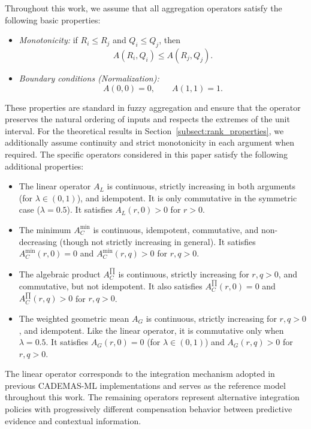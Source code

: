 \documentclass[mathematics,article,submit,moreauthors]{Definitions/mdpi}
\begin{document}
{\color{red}
Throughout this work, we assume that all aggregation operators satisfy the following basic properties:

\begin{itemize}
\item \textit{Monotonicity:} if $R_i\le R_j$ and $Q_i\le Q_j$, then
\[
A(R_i,Q_i)\le A(R_j,Q_j).
\]
\item \textit{Boundary conditions (Normalization):}
\[
A(0,0)=0,\qquad A(1,1)=1.
\]
\end{itemize}

These properties are standard in fuzzy aggregation and ensure that the operator preserves the natural ordering of inputs and respects the extremes of the unit interval. For the theoretical results in Section~\ref{subsect:rank_properties}, we additionally assume continuity and strict monotonicity in each argument when required. The specific operators considered in this paper satisfy the following additional properties:

\begin{itemize}
\item The linear operator $A_L$ is continuous, strictly increasing in both arguments (for $\lambda\in(0,1)$), and idempotent. It is only commutative in the symmetric case ($\lambda=0.5$). It satisfies $A_L(r,0)>0$ for $r>0$.

\item The minimum $A_C^{\min}$ is continuous, idempotent, commutative, and non-decreasing (though not strictly increasing in general). It satisfies $A_C^{\min}(r,0)=0$ and $A_C^{\min}(r,q)>0$ for $r,q>0$.

\item The algebraic product $A_C^{\prod}$ is continuous, strictly increasing for $r,q>0$, and commutative, but not idempotent. It also satisfies $A_C^{\prod}(r,0)=0$ and $A_C^{\prod}(r,q)>0$ for $r,q>0$.

\item The weighted geometric mean $A_G$ is continuous, strictly increasing for $r,q>0$, and idempotent. Like the linear operator, it is commutative only when $\lambda=0.5$. It satisfies $A_G(r,0)=0$ (for $\lambda\in(0,1)$) and $A_G(r,q)>0$ for $r,q>0$.
\end{itemize}
}

The linear operator corresponds to the integration mechanism adopted in previous CADEMAS-ML implementations and serves as the reference model throughout this work. The remaining operators represent alternative integration policies with progressively different compensation behavior between predictive evidence and contextual information.
\end{document}
